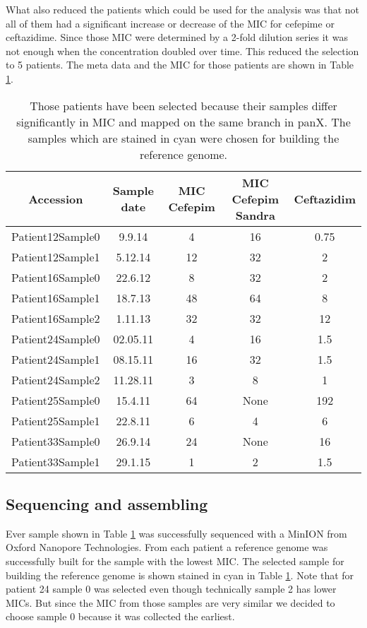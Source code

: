 What also reduced the patients which could be used for the analysis was that not all of them had a significant increase or decrease of the MIC for cefepime or ceftazidime. Since those MIC were determined by a 2-fold dilution series it was not enough when the concentration doubled over time. This reduced the selection to 5 patients. The meta data and the MIC for those patients are shown in Table \ref{table:samples_overview}. 
\begin{table}
	\begin{tabular}{|c c c c c|}	
		\hline
		Accession & Sample date & MIC Cefepim & MIC Cefepim Sandra & Ceftazidim \\ [0.5ex]
		\hline\hline
		\rowcolor{LightCyan}
		Patient12Sample0 & 9.9.14 & 4 & 16 & 0.75 \\
		Patient12Sample1 & 5.12.14 & 12 & 32 & 2 \\
		\hline
		\rowcolor{LightCyan}
		Patient16Sample0 & 22.6.12 & 8 & 32 & 2\\
		Patient16Sample1 & 18.7.13 & 48 & 64 & 8\\
		Patient16Sample2 & 1.11.13 & 32 & 32 & 12\\
		\hline
		\rowcolor{LightCyan}
		Patient24Sample0 & 02.05.11 & 4 & 16 & 1.5\\
		Patient24Sample1 & 08.15.11 & 16 & 32 & 1.5\\
		Patient24Sample2 & 11.28.11 & 3 & 8 & 1\\
		\hline
		Patient25Sample0 & 15.4.11 & 64 & None & 192\\
		\rowcolor{LightCyan}
		Patient25Sample1 & 22.8.11 & 6 & 4 & 6\\
		\hline
		Patient33Sample0 & 26.9.14 & 24 & None & 16 \\
		\rowcolor{LightCyan}
		Patient33Sample1 & 29.1.15 & 1 & 2 & 1.5\\
		\hline
	\end{tabular}
	\caption{Those patients have been selected because their samples differ significantly in MIC and mapped on the same branch in panX. The samples which are stained in cyan were chosen for building the reference genome.}
	\label{table:samples_overview}	
\end{table}

\subsection{Sequencing and assembling}
Ever sample shown in Table \ref{table:samples_overview} was successfully sequenced with a MinION from Oxford Nanopore Technologies. From each patient a reference genome was successfully built for the sample with the lowest MIC. The selected sample for building the reference genome is shown stained in cyan in Table \ref{table:samples_overview}. Note that for patient 24 sample 0 was selected even though technically sample 2 has lower MICs. But since the MIC from those samples are very similar we decided to choose sample 0 because it was collected the earliest. 

